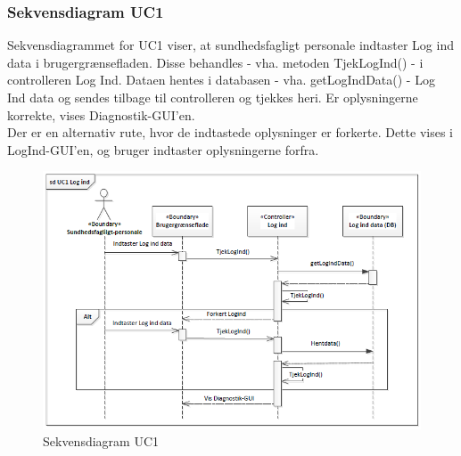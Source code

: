 \subsubsection{Sekvensdiagram UC1}
Sekvensdiagrammet for UC1 viser, at sundhedsfagligt personale indtaster Log ind data i brugergrænsefladen. Disse behandles - vha. metoden TjekLogInd() - i controlleren Log Ind. Dataen hentes i databasen - vha. getLogIndData() - Log Ind data og sendes tilbage til controlleren og tjekkes heri. Er oplysningerne korrekte, vises Diagnostik-GUI'en. \\
Der er en alternativ rute, hvor de indtastede oplysninger er forkerte. Dette vises i LogInd-GUI'en, og bruger indtaster oplysningerne forfra.
\begin{figure}[H]
\centering
\includegraphics[scale=0.70]{sd1.0.PNG}
\caption{Sekvensdiagram UC1}
\end{figure}

